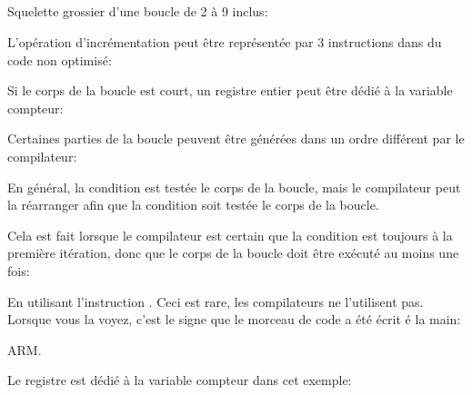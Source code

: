 ﻿%
\subsection{\Conclusion{}}

Squelette grossier d'une boucle de 2 à 9 inclus:



L'opération d'incrémentation peut être représentée par 3 instructions dans du code
non optimisé:



Si le corps de la boucle est court, un registre entier peut être dédié à la variable
compteur:



Certaines parties de la boucle peuvent être générées dans un ordre différent par
le compilateur:



En général, la condition est testée  le corps de la boucle, mais le compilateur
peut la réarranger afin que la condition soit testée  le corps de la boucle.

Cela est fait lorsque le compilateur est certain que la condition est toujours 
à la première itération, donc que le corps de la boucle doit être exécuté au moins
une fois:




En utilisant l'instruction . Ceci est rare, les compilateurs ne l'utilisent
pas.
Lorsque vous la voyez, c'est le signe que le morceau de code a été écrit é la main:



ARM. 

Le registre  est dédié à la variable compteur dans cet exemple:





